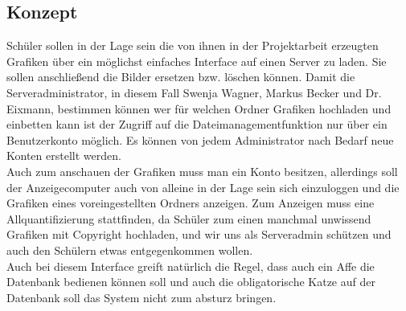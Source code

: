 \documentclass[a4paper,oneside,12pt,titlepage]{article}
\begin{document}
\subsection{Konzept} %
Schüler sollen in der Lage sein die von ihnen in der Projektarbeit erzeugten Grafiken über ein möglichst einfaches Interface auf einen Server zu laden. Sie sollen anschließend die Bilder ersetzen bzw. löschen können. Damit die Serveradministrator, in diesem Fall Swenja Wagner, Markus Becker und Dr. Eixmann, bestimmen können wer für welchen Ordner Grafiken hochladen und einbetten kann ist der Zugriff auf die Dateimanagementfunktion nur über ein Benutzerkonto möglich. Es können von jedem Administrator nach Bedarf neue Konten erstellt werden. \\
Auch zum anschauen der Grafiken muss man ein Konto besitzen, allerdings soll der Anzeigecomputer auch von alleine in der Lage sein sich einzuloggen und die Grafiken eines voreingestellten Ordners anzeigen. Zum Anzeigen muss eine Allquantifizierung stattfinden, da Schüler zum einen manchmal unwissend Grafiken mit Copyright hochladen, und wir uns als Serveradmin schützen und auch den Schülern etwas entgegenkommen wollen. \\
Auch bei diesem Interface greift natürlich die Regel, dass auch ein Affe die Datenbank bedienen können soll und auch die obligatorische Katze auf der Datenbank soll das System nicht zum absturz bringen.
\end{document}
